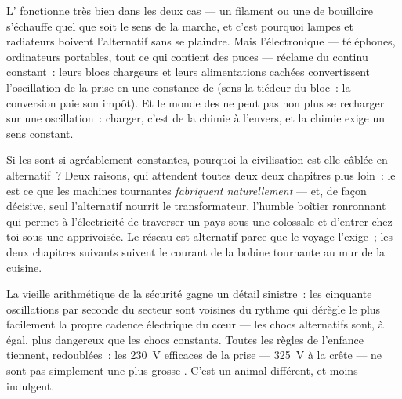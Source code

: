 \begin{example}\label{ex:g9:alternating-current:whocares}
L' fonctionne très bien dans les deux cas --- un
filament ou une  de bouilloire s'échauffe quel que soit le
sens de la marche, et c'est pourquoi lampes et radiateurs boivent
l'alternatif sans se plaindre. Mais l'électronique --- téléphones,
ordinateurs portables, tout ce qui contient des puces --- réclame du
continu constant~: leurs blocs chargeurs et leurs alimentations
cachées convertissent l'oscillation de la prise en une constance de
 (sens la tiédeur du bloc~: la conversion paie son impôt). Et le
monde des  ne peut pas non plus se recharger sur une
oscillation~: charger, c'est de la chimie à l'envers, et la chimie
exige un sens constant.
\end{example}

\begin{remark}\label{rem:g9:alternating-current:why}
Si les  sont si agréablement constantes, pourquoi la civilisation
est-elle câblée en alternatif~? Deux raisons, qui attendent toutes
deux deux chapitres plus loin~: le  est ce que les
machines tournantes \emph{fabriquent naturellement} --- et, de façon
décisive, seul l'alternatif nourrit le transformateur, l'humble
boîtier ronronnant qui permet à l'électricité de traverser un pays
sous une  colossale et d'entrer chez toi sous une 
apprivoisée. Le réseau est alternatif parce que le voyage l'exige~;
les deux chapitres suivants suivent le courant de la bobine tournante
au mur de la cuisine.
\end{remark}

\begin{remark}\label{rem:g9:alternating-current:safety}
La vieille arithmétique de la sécurité gagne un détail sinistre~: les
cinquante oscillations par seconde du secteur sont voisines du rythme
qui dérègle le plus facilement la propre cadence électrique du
cœur --- les chocs alternatifs sont, à  égal, plus dangereux que
les chocs constants. Toutes les règles de l'enfance tiennent,
redoublées~: les \qty{230}{V} efficaces de la prise --- \qty{325}{V} à
la crête --- ne sont pas simplement une plus grosse . C'est un
animal différent, et moins indulgent.
\end{remark}


